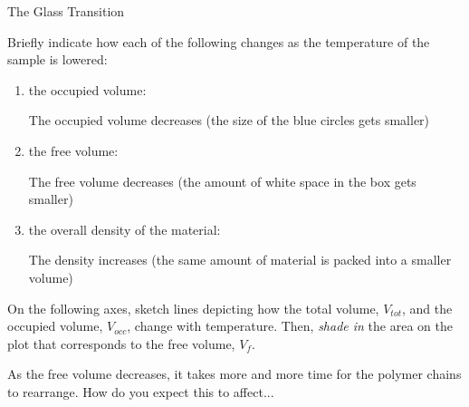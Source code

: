 \begin{activity}{The Glass Transition}
\begin{model}
\end{model}


\begin{ctqs}

	\question Briefly indicate how each of the following changes as the temperature of the sample is lowered:
	
		\begin{enumerate}
		
			\item the occupied volume:
			
				\begin{solution}[0.25in]
					The occupied volume decreases (the size of the blue circles gets smaller)
				\end{solution}
			
			\item the free volume:
			
				\begin{solution}[0.25in]
					The free volume decreases (the amount of white space in the box gets smaller)
				\end{solution}
			
			\item the overall density of the material:
			
				\begin{solution}[0.25in]
					The density increases (the same amount of material is packed into a smaller volume)
				\end{solution}
			
		\end{enumerate}
		
	\question On the following axes, sketch lines depicting how the total volume, $V_{tot}$, and the occupied volume, $V_{occ}$, change with temperature.  Then, \emph{shade in} the area on the plot that corresponds to the free volume, $V_f$. \label{\labelbase:ctq:VTplot1}
	
		\vspace{0.25in}
		\begin{solution}[1.5in]\end{solution}
		
	\question As the free volume decreases, it takes more and more time for the polymer chains to rearrange.  How do you expect this to affect... \label{\labelbase:ctq:viscosityconcept}
	

\end{ctqs}
\end{activity}
